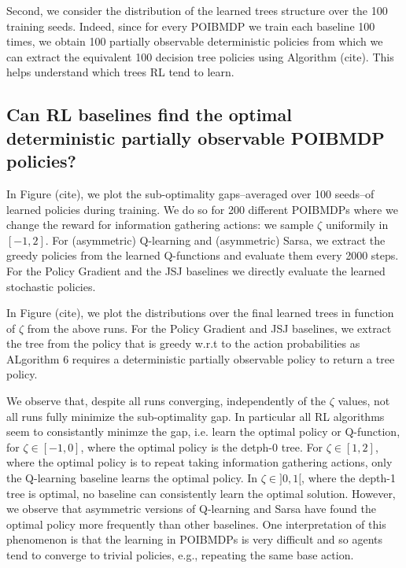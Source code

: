 Second, we consider the distribution of the learned trees structure over the 100 training seeds.
Indeed, since for every POIBMDP we train each baseline 100 times, we obtain 100 partially observable deterministic policies from which we can extract the equivalent 100 decision tree policies using Algorithm (cite).
This helps understand which trees RL tend to learn.

\subsection{Can RL baselines find the optimal deterministic partially observable POIBMDP policies?}

In Figure (cite), we plot the sub-optimality gaps--averaged over 100 seeds--of learned policies during training.
We do so for 200 different POIBMDPs where we change the reward for information gathering actions: we sample $\zeta$ uniformily in $[-1, 2]$.
For (asymmetric) Q-learning and (asymmetric) Sarsa, we extract the greedy policies from the learned Q-functions and evaluate them every 2000 steps.
For the Policy Gradient and the JSJ baselines we directly evaluate the learned stochastic policies.

In Figure (cite), we plot the distributions over the final learned trees in function of $\zeta$ from the above runs.
For the Policy Gradient and JSJ baselines, we extract the tree from the policy that is greedy w.r.t to the action probabilities as ALgorithm 6 requires a deterministic partially observable policy to return a tree policy.

We observe that, despite all runs converging, independently of the $\zeta$ values, not all runs fully minimize the sub-optimality gap.
In particular all RL algorithms seem to consistantly minimze the gap, i.e. learn the optimal policy or Q-function, for $\zeta \in [-1, 0]$, where the optimal policy is the detph-0 tree.
For $\zeta \in [1, 2]$, where the optimal policy is to repeat taking information gathering actions, only the Q-learning baseline learns the optimal policy. 
In $\zeta \in ]0, 1[$, where the depth-1 tree is optimal, no baseline can consistently learn the optimal solution. However, we observe that asymmetric versions of Q-learning and Sarsa have found the optimal policy more frequently than other baselines.
One interpretation of this phenomenon is that the learning in POIBMDPs is very difficult and so agents tend to converge to trivial policies, e.g., repeating the same base action.

